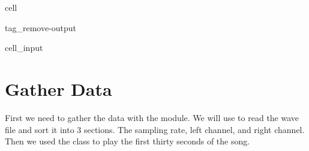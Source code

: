 \documentclass[letterpaper,10pt,english]{jupyterBook}
\begin{document}
\begin{sphinxuseclass}{cell}
\begin{sphinxuseclass}{tag_remove-output}\begin{sphinxVerbatimInput}

\begin{sphinxuseclass}{cell_input}
\begin{sphinxVerbatim}[commandchars=\\\{\}]
   
     
   
   
   
\end{sphinxVerbatim}

\end{sphinxuseclass}\end{sphinxVerbatimInput}

\end{sphinxuseclass}
\end{sphinxuseclass}

\section{Gather Data}
\label{\detokenize{content/0_project_part2:gather-data}}
\sphinxAtStartPar
First we need to gather the data with the  module. We will use  to read the wave file and sort it into 3 sections. The sampling rate, left channel, and right channel. Then we used the  class to play the first thirty seconds of the song.
\end{document}
